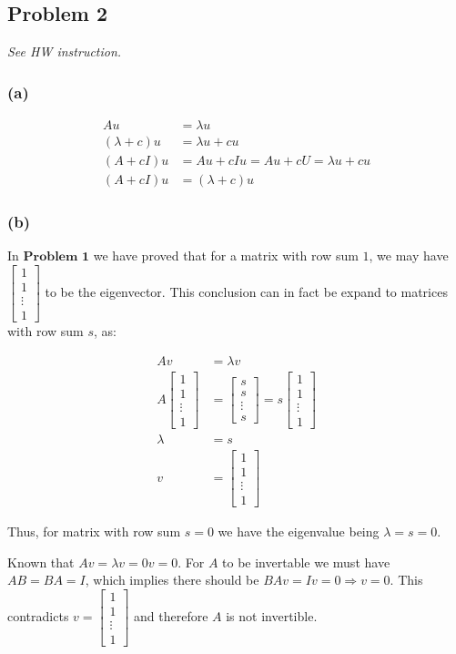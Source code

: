 \documentclass[11pt]{article}
\providecommand{\qbm}[1]{\begin{bmatrix} #1 \end{bmatrix}}
\begin{document}
\subsection*{Problem 2}
\textit{See HW instruction.}\newline

\subsubsection*{(a)}

\begin{align*}
    Au &= \lambda u \\
    (\lambda + c)u &= \lambda u + cu \\
    (A + cI)u &= Au + cIu = Au + cU = \lambda u + cu \\
    (A + cI)u &= (\lambda + c)u
\end{align*}

\subsubsection*{(b)}

In $\textbf{Problem 1}$ we have proved that for a matrix with row sum $1$, we may have $\qbm{1 \\ 1\\ \vdots \\ 1}$ to be the eigenvector. This conclusion can in fact be expand to matrices with row sum $s$, as:

\begin{align*}
    Av &= \lambda v \\
    A \qbm{1 \\ 1\\ \vdots \\ 1} &= \qbm{s \\ s\\ \vdots \\ s} = s \qbm{1 \\ 1\\ \vdots \\ 1} \\
    \lambda &= s \\
    v &= \qbm{1 \\ 1\\ \vdots \\ 1}
\end{align*}

Thus, for matrix with row sum $s = 0$ we have the eigenvalue being $\lambda = s = 0$.

Known that $Av = \lambda v = 0 v = 0$. For $A$ to be invertable we must have $AB = BA = I$, which implies there should be $BAv = Iv = 0 \Longrightarrow v = 0$. This contradicts $v = \qbm{1 \\ 1\\ \vdots \\ 1}$ and therefore $A$ is not invertible.
\end{document}
